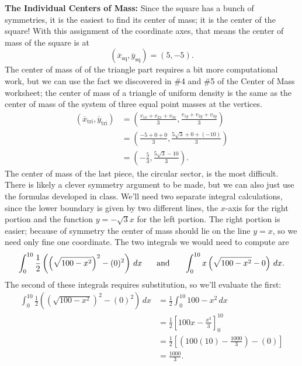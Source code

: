 \documentclass[12pt]{amsart}
\begin{document}
{\bf The Individual Centers of Mass:} Since the square has a bunch of symmetries, it is the easiest to find its center of mass; it is the center of the square!  With this assignment of the coordinate axes, that means the center of mass of the square is at $$\left(\overline{x}_{\text{sq}}, \overline{y}_{\text{sq}}\right) = (5,-5).$$
The center of mass of of the triangle part requires a bit more computational work, but we can use the fact we discovered in \#4 and \#5 of the Center of Mass worksheet; the center of mass of a triangle of uniform density is the same as the center of mass of the system of three equal point masses at the vertices.
\begin{align*}
(\overline{x}_{\text{tri}}, \overline{y}_{\text{tri}}) &  = \left(\frac{v_{1x} + v_{2x} + v_{3x}}{3}, \frac{v_{1y} + v_{2y} + v_{3y}}{3} \right)\\
& =\left(\frac{-5 + 0 + 0}{3},\frac{5\sqrt{3} + 0 + (-10)}{3} \right)\\
& = \left(-\frac{5}{3}, \frac{5\sqrt{3} - 10}{3}\right).
\end{align*}
The center of mass of the last piece, the circular sector, is the most difficult. There is likely a clever symmetry argument to be made, but we can also just use the formulas developed in class.  We'll need two separate integral calculations, since the lower boundary is given by two different lines, the $x$-axis for the right portion and the function $y = -\sqrt{3}x$ for the left portion.  The right portion is easier; because of symmetry the center of mass should lie on the line $y = x$, so we need only fine one coordinate.  The two integrals we would need to compute are $$\int_0^{10} \frac{1}{2}\left(\left(\sqrt{100 - x^2}\right)^2 - (0)^2\right)\,dx \hspace{.2in} \text{ and } \hspace{.2in} \int_0^{10} x\left(\sqrt{100 - x^2} - 0\right)\,dx.$$
The second of these integrals requires substitution, so we'll evaluate the first:
\begin{align*}
\int_0^{10} \frac{1}{2}\left(\left(\sqrt{100 - x^2}\right)^2 - (0)^2\right)\,dx & = \frac{1}{2}\int_0^{10} 100 - x^2\,dx\\
& = \frac{1}{2}\left[100x - \frac{x^3}{3}\right]_0^{10}\\
& = \frac{1}{2}\left[\left(100(10) - \frac{1000}{3}\right) - \left(0\right)\right]\\
& = \frac{1000}{3}.
\end{align*}
\end{document}
